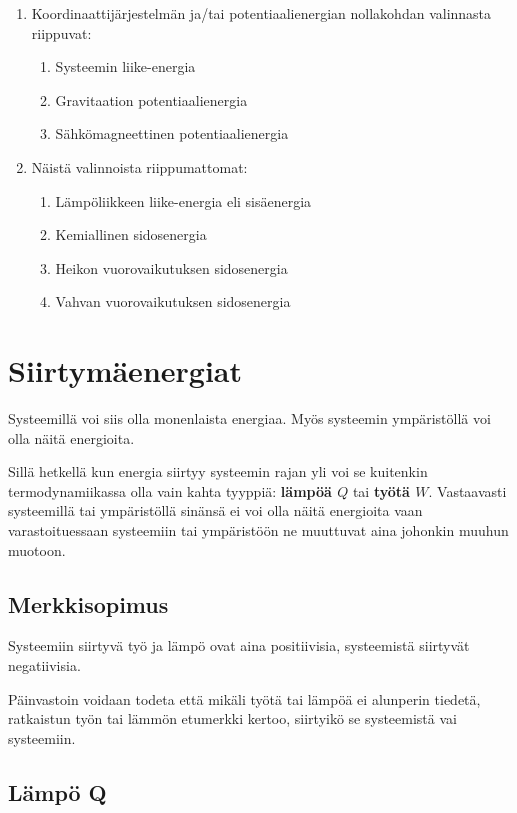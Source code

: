 \documentclass[12pt,a4paper,finnish]{book}
\begin{document}
\begin{enumerate}
 \item Koordinaattijärjestelmän ja/tai potentiaalienergian nollakohdan valinnasta riippuvat:
 \begin{enumerate}
  \item Systeemin liike-energia
  \item Gravitaation potentiaalienergia
  \item Sähkömagneettinen potentiaalienergia
 \end{enumerate}
 \item Näistä valinnoista riippumattomat:
 \begin{enumerate}
  \item Lämpöliikkeen liike-energia eli sisäenergia
  \item Kemiallinen sidosenergia
  \item Heikon vuorovaikutuksen sidosenergia
  \item Vahvan vuorovaikutuksen sidosenergia
 \end{enumerate}
\end{enumerate}



\chapter{Siirtymäenergiat}

Systeemillä voi siis olla monenlaista energiaa. Myös systeemin ympäristöllä voi olla näitä 
energioita.

Sillä hetkellä kun energia siirtyy systeemin rajan yli voi se kuitenkin termodynamiikassa 
olla vain kahta tyyppiä: \textbf{lämpöä $Q$} tai \textbf{työtä $W$}. Vastaavasti systeemillä 
tai ympäristöllä sinänsä ei voi olla näitä energioita vaan varastoituessaan systeemiin tai 
ympäristöön ne muuttuvat aina johonkin muuhun muotoon.

\section{Merkkisopimus} \label{sec:merkkisopimus}

Systeemiin siirtyvä työ ja lämpö ovat aina positiivisia, systeemistä siirtyvät negatiivisia.

Päinvastoin voidaan todeta että mikäli työtä tai lämpöä ei alunperin tiedetä, ratkaistun 
työn tai lämmön etumerkki kertoo, siirtyikö se systeemistä vai systeemiin.

\section{Lämpö Q}
\end{document}
